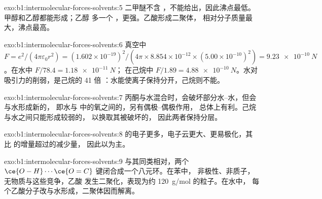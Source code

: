 \begin{solution}{exo:b1:intermolecular-forces-solvents:5}
二甲醚不含 ，不能给出，因此沸点最低。
甲醇和乙醇都能形成；乙醇
多一个 ，更强。乙酸形成二聚体，
相对分子质量最大，沸点最高。
\end{solution}

\begin{solution}{exo:b1:intermolecular-forces-solvents:6}
真空中 $F = e^2/(4\pi\varepsilon_0 r^2) = (1.602 \times
10^{-19})^2/(4\pi \times 8.854 \times 10^{-12} \times (5.00 \times
10^{-10})^2) = \qty{9.23e-10}{N}$。在水中 $F/78.4 = \qty{1.18e-11}{N}$；
在己烷中 $F/1.89 = \qty{4.88e-10}{N}$。水对吸引力的削弱，是己烷的 41 倍
：水能使离子保持分开，己烷则不能。
\end{solution}

\begin{solution}{exo:b1:intermolecular-forces-solvents:7}
丙酮与水混合时，会破坏部分水–水，但会与水形成新的，
即水与  中的氧之间的，另有偶极–偶极作用，
总体上有利。己烷与水之间只能形成较弱的，
以换取其被破坏的，
因此两者保持分层。
\end{solution}

\begin{solution}{exo:b1:intermolecular-forces-solvents:8}
 的电子更多，电子云更大、更易极化，其
比  的增量超过的减少量，
因此以为主。
\end{solution}

\begin{solution}{exo:b1:intermolecular-forces-solvents:9}
 与其同类相对，两个
$\ce{O-H}\cdots\ce{O=C}$ 键闭合成一个八元环。在苯中，
非极性、非质子，无物质与这些竞争，乙酸
发生二聚化，表现为约 \qty{120}{g/mol} 的粒子。在水中，
每个乙酸分子改与水形成，二聚体因而解离。
\end{solution}

